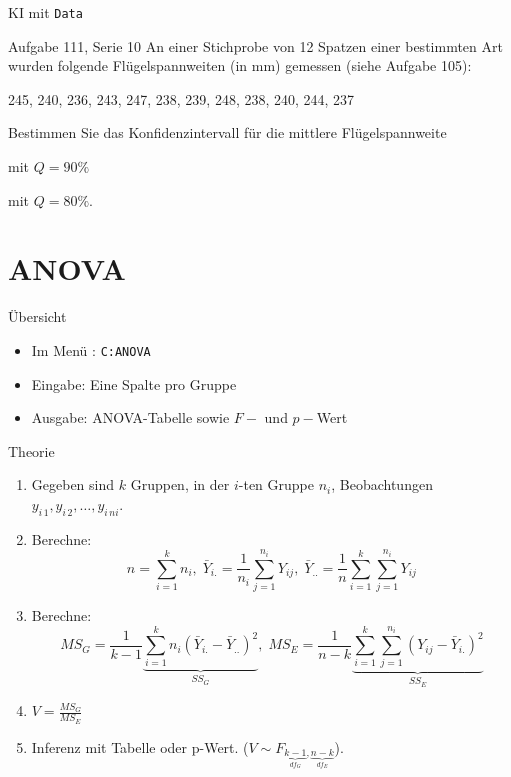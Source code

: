 \documentclass[handout]{beamer}
\newlength{\tikey}
\newcommand{\keystroke}[1]{\settowidth{\tikey}{\scriptsize #1}\psframebox[framearc=0.2]{\parbox{\tikey}{\scriptsize #1}}}
\begin{document}
\begin{frame}{KI mit \texttt{Data}}
\begin{beamerboxesrounded}[shadow]{Aufgabe 111, Serie 10}
An einer Stichprobe von 12 Spatzen einer bestimmten Art wurden folgende
Flügelspannweiten (in mm) gemessen (siehe Aufgabe 105):

\begin{center}
245, 240, 236, 243, 247, 238, 239, 248, 238, 240, 244, 237
\end{center}

Bestimmen Sie das Konfidenzintervall für die mittlere Flügelspannweite
\begin{outline}
\item mit $Q = 90\%$
\item mit $Q = 80\%$.
\end{outline}
\end{beamerboxesrounded}
\end{frame}

\section{ANOVA}
\begin{frame}{Übersicht}
\begin{itemize}
\item Im Menü \keystroke{F6}: \texttt{C:ANOVA}
\item Eingabe: Eine Spalte pro Gruppe
\item Ausgabe: ANOVA-Tabelle sowie $F-$ und $p-$Wert
\end{itemize}
\end{frame}

\begin{frame}{Theorie}
\begin{enumerate}
\item Gegeben sind $k$ Gruppen, in der $i$-ten Gruppe $n_i$, Beobachtungen
$y_{i\,1}, y_{i\,2}, \ldots, y_{i\,ni}$.
\item Berechne:
$$
n=\sum_{i=1}^k n_i,\;
\bar{Y}_{i.}=\frac{1}{n_i}\sum_{j=1}^{n_i}Y_{ij},\; 
\bar{Y}_{..}=\frac{1}{n}\sum_{i=1}^k\sum_{j=1}^{n_i}Y_{ij}
$$
\item Berechne:
$$
MS_G=\frac{1}{k-1}\underbrace{\sum_{i=1}^k n_i(\bar{Y}_{i.}-\bar{Y}_{..})^2}_{SS_G},\;
MS_E=\frac{1}{n-k}\underbrace{\sum_{i=1}^k\sum_{j=1}^{n_i}(Y_{ij}-\bar{Y}_{i.})^2}_{SS_E}
$$
\item $V=\frac{MS_G}{MS_E}$
\item Inferenz mit Tabelle oder p-Wert. ($V\sim F_{\underbrace{k-1}_{df_G},\underbrace{n-k}_{df_E}}$).
\end{enumerate}
\end{frame}
\end{document}
